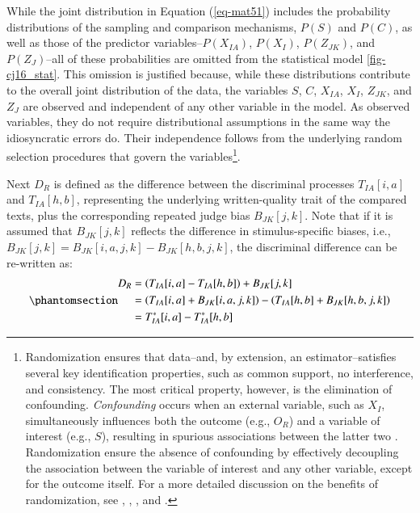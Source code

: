 \documentclass[
  authoryear,
  review,
  1p]{elsarticle}
\begin{document}
While the joint distribution in Equation (\ref{eq-mat51}) includes the
probability distributions of the sampling and comparison mechanisms,
\(P(S)\) and \(P(C)\), as well as those of the predictor
variables--\(P(X_{IA})\), \(P(X_{I})\), \(P(Z_{JK})\), and
\(P(Z_{J})\)--all of these probabilities are omitted from the
statistical model \ref{fig-cj16_stat}. This omission is justified
because, while these distributions contribute to the overall joint
distribution of the data, the variables \(S\), \(C\), \(X_{IA}\),
\(X_{I}\), \(Z_{JK}\), and \(Z_{J}\) are observed and independent of any
other variable in the model. As observed variables, they do not require
distributional assumptions in the same way the idiosyncratic errors do.
Their independence follows from the underlying random selection
procedures that govern the variables\footnote{Randomization ensures that
  data--and, by extension, an estimator--satisfies several key
  identification properties, such as common support, no interference,
  and consistency. The most critical property, however, is the
  elimination of confounding. \emph{Confounding} occurs when an external
  variable, such as \(X_{I}\), simultaneously influences both the
  outcome (e.g., \(O_{R}\)) and a variable of interest (e.g., \(S\)),
  resulting in spurious associations between the latter two
  \citep{Everitt_et_al_2010}. Randomization ensure the absence of
  confounding by effectively decoupling the association between the
  variable of interest and any other variable, except for the outcome
  itself. For a more detailed discussion on the benefits of
  randomization, see \citet{Pearl_2009}, \citet{Morgan_et_al_2014},
  \citet{Neal_2020}, and \citet{Hernan_et_al_2025}.}.

Next \(D_{R}\) is defined as the difference between the discriminal
processes \(T_{IA}[i, a]\) and \(T_{IA}[h, b]\), representing the
underlying written-quality trait of the compared texts, plus the
corresponding repeated judge bias \(B_{JK}[j, k]\). Note that if it is
assumed that \(B_{JK}[j,k]\) reflects the difference in
stimulus-specific biases, i.e.,
\(B_{JK}[j,k] = B_{JK}[i,a,j,k] - B_{JK}[h,b,j,k]\), the discriminal
difference can be re-written as:
\begin{equation}\phantomsection\label{eq-mat52}{
\begin{aligned}
D_{R} &= \left( T_{IA}[i,a] - T_{IA}[h,b] \right) + B_{JK}[j,k] \\
&= \left( T_{IA}[i, a] + B_{JK}[i, a, j, k] \right) - \left( T_{IA}[h, b] + B_{JK}[h, b, j, k] \right) \\
& = T^{*}_{IA}[i,a] - T^{*}_{IA}[h,b]
\end{aligned}
}\end{equation}
\end{document}
